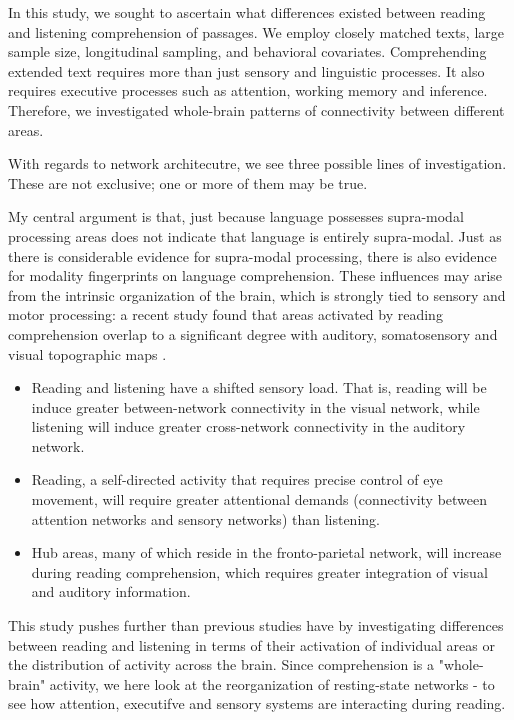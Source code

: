 In this study, we sought to ascertain what differences existed between reading and listening comprehension of passages. We employ closely matched texts, large sample size, longitudinal sampling, and behavioral covariates. Comprehending extended text requires more than just sensory and linguistic processes. It also requires executive processes such as attention, working memory and inference. Therefore, we investigated whole-brain patterns of connectivity between different areas. 

With regards to network architecutre, we see three possible lines of investigation. These are not exclusive; one or more of them may be true.

My central argument is that, just because language possesses supra-modal processing areas does not indicate that language is entirely supra-modal. Just as there is considerable evidence for supra-modal processing, there is also evidence for modality fingerprints on language comprehension. These influences may arise from the intrinsic organization of the brain, which is strongly tied to sensory and motor processing: a recent study found that areas activated by reading comprehension overlap to a significant degree with auditory, somatosensory and visual topographic maps \cite{Sood2016}. 

\begin{itemize}
	\item Reading and listening have a shifted sensory load. That is, reading will be induce greater between-network connectivity in the visual network, while listening will induce greater cross-network connectivity in the auditory network.  
	\item Reading, a self-directed activity that requires precise control of eye movement, will require greater attentional demands (connectivity between attention networks and sensory networks) than listening. 
	\item Hub areas, many of which reside in the fronto-parietal network, will increase during reading comprehension, which requires greater integration of visual and auditory information.
\end{itemize}

This study pushes further than previous studies have by investigating differences between reading and listening in terms of their activation of individual areas or the distribution of activity across the brain. Since comprehension is a "whole-brain" activity, we here look at the reorganization of resting-state networks - to see how attention, executifve and sensory systems are interacting during reading.

